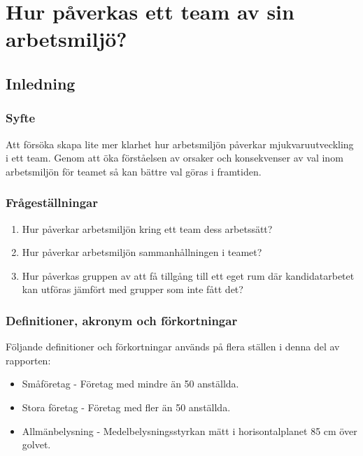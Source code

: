 \chapter{Hur påverkas ett team av sin arbetsmiljö?}
\label{cha:indiv-report-hampus}

\section{Inledning}
\label{sec:introduction-hampus}


\subsection{Syfte}
\label{sec:purpose-hampus}

Att försöka skapa lite mer klarhet hur  arbetsmiljön påverkar mjukvaruutveckling i ett team. Genom att öka förståelsen av orsaker och konsekvenser av val inom arbetsmiljön för teamet så kan bättre val göras i framtiden.

\subsection{Frågeställningar}
\label{sec:issue-hampus}

\begin{enumerate}
\item Hur påverkar arbetsmiljön kring ett team dess arbetssätt?
\item Hur påverkar arbetsmiljön sammanhållningen i teamet?
\item Hur påverkas gruppen av att få tillgång till ett eget rum där kandidatarbetet kan utföras jämfört med grupper som inte fått det?
\end{enumerate}

\subsection{Definitioner, akronym och förkortningar}
Följande definitioner och förkortningar används på flera ställen i denna del av rapporten:

\begin{itemize}
\item Småföretag - Företag med mindre än 50 anställda.
\item Stora företag - Företag med fler än 50 anställda.
\item Allmänbelysning - Medelbelysningsstyrkan mätt i horisontalplanet 85 cm över golvet.
\end{itemize}

